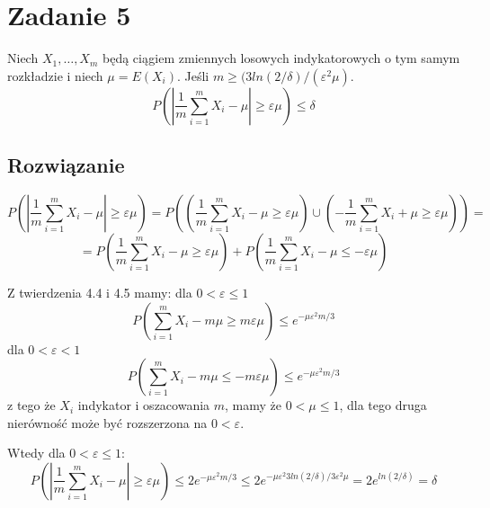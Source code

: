 \section{Zadanie 5}
Niech \(X_{1},\dots,X_{m}\) będą ciągiem zmiennych losowych indykatorowych o tym samym rozkładzie i niech \(\mu = E(X_{i})\).
Jeśli \(m \geqslant (3ln(2/\delta)/(\varepsilon^{2}\mu)\).
\[P\left(\left|\frac{1}{m}\sum_{i=1}^{m}X_{i}-\mu\right|\geqslant\varepsilon\mu\right) \leqslant \delta\]

\subsection*{Rozwiązanie}
\[P\left(\left|\frac{1}{m}\sum_{i=1}^{m}X_{i}-\mu\right|\geqslant\varepsilon\mu\right) = P\left(\left(\frac{1}{m}\sum_{i=1}^{m}X_{i}-\mu\geqslant\varepsilon\mu\right)\cup\left(-\frac{1}{m}\sum_{i=1}^{m}X_{i}+\mu\geqslant\varepsilon\mu\right)\right) = \]
\[= P\left(\frac{1}{m}\sum_{i=1}^{m}X_{i}-\mu\geqslant\varepsilon\mu\right) + P\left(\frac{1}{m}\sum_{i=1}^{m}X_{i}-\mu\leqslant-\varepsilon\mu\right)\]

Z twierdzenia 4.4 i 4.5 mamy:
dla \(0 < \varepsilon \leqslant 1\)
\[ P\left(\sum_{i=1}^{m}X_{i}-m\mu\geqslant m\varepsilon\mu\right) \leqslant e^{-\mu\varepsilon^2m/3}\]
dla \(0 < \varepsilon < 1\)
\[ P\left(\sum_{i=1}^{m}X_{i}-m\mu\leqslant-m\varepsilon\mu\right) \leqslant e^{-\mu\varepsilon^2m/3}\]
z tego że \(X_{i}\) indykator i oszacowania \(m\), mamy że \(0 < \mu \leqslant 1\), dla tego druga nierówność może być
rozszerzona na \(0 < \varepsilon\).

Wtedy dla \(0 < \varepsilon \leqslant 1\):
\[P\left(\left|\frac{1}{m}\sum_{i=1}^{m}X_{i}-\mu\right|\geqslant\varepsilon\mu\right) \leqslant 2e^{-\mu\varepsilon^2m/3} \leqslant 2e^{-\mu\varepsilon^2 3ln(2/\delta)/3\varepsilon^{2}\mu} = 2e^{ln(2/\delta)} = \delta\]